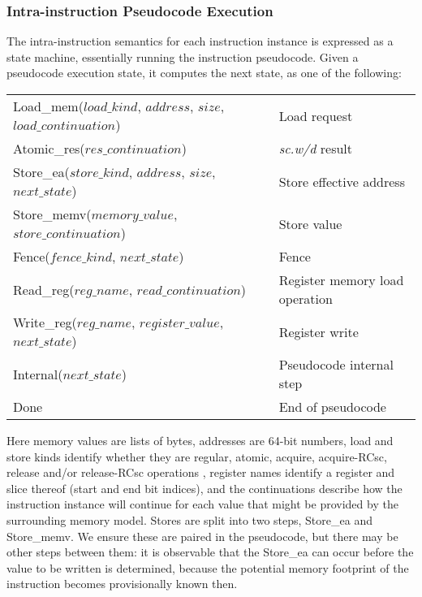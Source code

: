 \subsubsection{Intra-instruction Pseudocode Execution}
The intra-instruction semantics for each instruction instance is expressed as a state machine, essentially running the instruction pseudocode.
Given a pseudocode execution state, it computes the next state, as one of the following:

\begin{center}
\begin{tabular}{ll}
{\sc Load\_mem}($load\_kind$, $address$, $size$, $load\_continuation$)
    & Load request\\
{\sc Atomic\_res}($res\_continuation$)
    & {\em sc.w/d} result\\
{\sc Store\_ea}($store\_kind$, $address$, $size$, $next\_state$)
    & Store effective address\\
{\sc Store\_memv}($memory\_value$, $store\_continuation$)
    & Store value\\
{\sc Fence}($fence\_kind$, $next\_state$)
    & Fence\\
{\sc Read\_reg}($reg\_name$, $read\_continuation$)
    & Register memory load operation\\
{\sc Write\_reg}($reg\_name$, $register\_value$, $next\_state$)
    & Register write\\
{\sc Internal}($next\_state$)
    & Pseudocode internal step\\
{\sc Done}
    & End of pseudocode\\
\end{tabular}
\end{center}
Here memory values are lists of bytes, addresses are 64-bit  numbers, load and store kinds identify whether they are regular, atomic, acquire, acquire-RCsc, release and/or release-RCsc operations , register names identify a register and slice thereof (start and end bit indices), and the continuations describe how the instruction instance will continue for each value that might be provided by the surrounding memory model.
Stores are split into two steps, {\sc Store\_ea} and {\sc Store\_memv}.
We ensure these are paired in the pseudocode, but there may be other steps between them: it is observable that the {\sc Store\_ea} can occur before the value to be written is determined, because the potential memory footprint of the instruction becomes provisionally known then.

